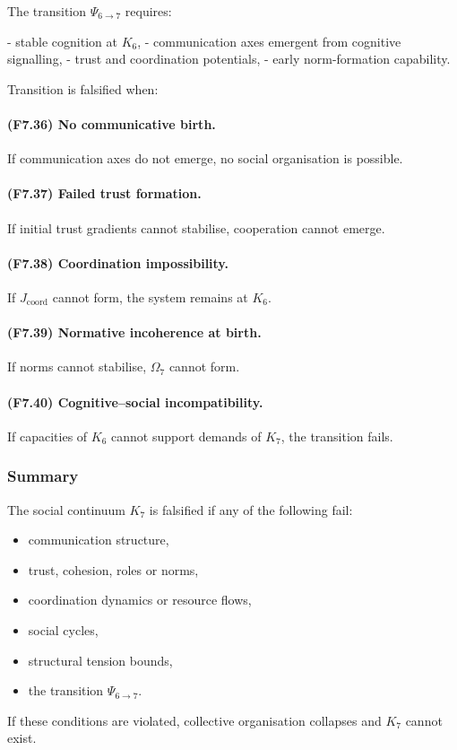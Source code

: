The transition $\Psi_{6\to 7}$ requires:

- stable cognition at $K_6$,
- communication axes emergent from cognitive signalling,
- trust and coordination potentials,
- early norm-formation capability.

Transition is falsified when:

\paragraph{(F7.36) No communicative birth.}
If communication axes do not emerge,
no social organisation is possible.

\paragraph{(F7.37) Failed trust formation.}
If initial trust gradients cannot stabilise,
cooperation cannot emerge.

\paragraph{(F7.38) Coordination impossibility.}
If $J_{\mathrm{coord}}$ cannot form,
the system remains at $K_6$.

\paragraph{(F7.39) Normative incoherence at birth.}
If norms cannot stabilise,
$\Omega_7$ cannot form.

\paragraph{(F7.40) Cognitive–social incompatibility.}
If capacities of $K_6$ cannot support demands of $K_7$,
the transition fails.



\subsubsection{Summary}

The social continuum $K_7$ is falsified if any of the following fail:

\begin{itemize}
    \item communication structure,
    \item trust, cohesion, roles or norms,
    \item coordination dynamics or resource flows,
    \item social cycles,
    \item structural tension bounds,
    \item the transition $\Psi_{6\to 7}$.
\end{itemize}

If these conditions are violated,
collective organisation collapses and $K_7$ cannot exist.
